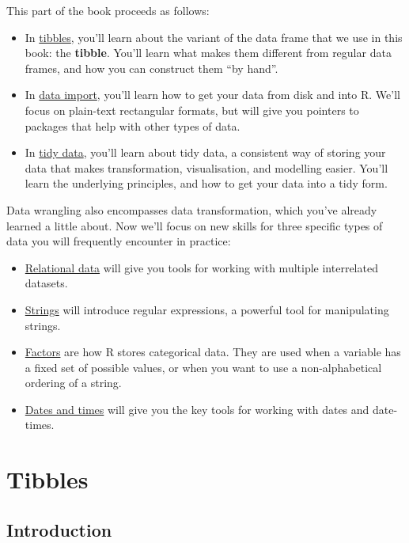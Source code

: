 \documentclass[]{book}
\begin{document}
This part of the book proceeds as follows:

\begin{itemize}
\item
  In \protect\hyperlink{tibbles-1}{tibbles}, you'll learn about the
  variant of the data frame that we use in this book: the
  \textbf{tibble}. You'll learn what makes them different from regular
  data frames, and how you can construct them ``by hand''.
\item
  In \protect\hyperlink{data-import}{data import}, you'll learn how to
  get your data from disk and into R. We'll focus on plain-text
  rectangular formats, but will give you pointers to packages that help
  with other types of data.
\item
  In \protect\hyperlink{tidy-data-1}{tidy data}, you'll learn about tidy
  data, a consistent way of storing your data that makes transformation,
  visualisation, and modelling easier. You'll learn the underlying
  principles, and how to get your data into a tidy form.
\end{itemize}

Data wrangling also encompasses data transformation, which you've
already learned a little about. Now we'll focus on new skills for three
specific types of data you will frequently encounter in practice:

\begin{itemize}
\item
  \protect\hyperlink{relational-data}{Relational data} will give you
  tools for working with multiple interrelated datasets.
\item
  \protect\hyperlink{strings}{Strings} will introduce regular
  expressions, a powerful tool for manipulating strings.
\item
  \protect\hyperlink{factors-1}{Factors} are how R stores categorical
  data. They are used when a variable has a fixed set of possible
  values, or when you want to use a non-alphabetical ordering of a
  string.
\item
  \protect\hyperlink{dates-and-times}{Dates and times} will give you the
  key tools for working with dates and date-times.
\end{itemize}

\chapter{Tibbles}\label{tibbles}

\section{Introduction}\label{introduction-4}
\end{document}
